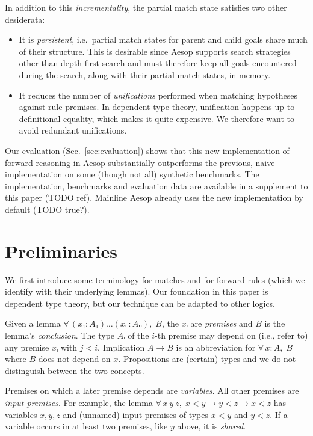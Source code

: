 \documentclass[runningheads]{llncs}
\newcommand{\All}[2]{\ensuremath{\forall\, #1,\; #2}}
\begin{document}
In addition to this \emph{incrementality}, the partial match state satisfies two other desiderata:
\begin{itemize}
  \item It is \emph{persistent}, i.e.\ partial match states for parent and child goals share much of their structure.
        This is desirable since Aesop supports search strategies other than depth-first search and must therefore keep all goals encountered during the search, along with their partial match states, in memory.
  \item It reduces the number of \emph{unifications} performed when matching hypotheses against rule premises.
        In dependent type theory, unification happens up to definitional equality, which makes it quite expensive.
        We therefore want to avoid redundant unifications.
\end{itemize}

Our evaluation (Sec.~\ref{sec:evaluation}) shows that this new implementation of forward reasoning in Aesop substantially outperforms the previous, naive implementation on some (though not all) synthetic benchmarks.
The implementation, benchmarks and evaluation data are available in a supplement to this paper (TODO ref).
Mainline Aesop already uses the new implementation by default (TODO true?).

\section{Preliminaries}

We first introduce some terminology for matches and for forward rules (which we identify with their underlying lemmas).
Our foundation in this paper is dependent type theory, but our technique can be adapted to other logics.

Given a lemma $\All{(x₁ : A₁) \dots (xₙ : Aₙ)}{B}$, the $xᵢ$ are \emph{premises} and $B$ is the lemma's \emph{conclusion}.
The type $Aᵢ$ of the $i$-th premise may depend on (i.e., refer to) any premise $xⱼ$ with $j < i$.
Implication $A → B$ is an abbreviation for $\All{x : A}{B}$ where $B$ does not depend on $x$.
Propositions are (certain) types and we do not distinguish between the two concepts.

Premises on which a later premise depends are \emph{variables}.
All other premises are \emph{input premises}.
For example, the lemma $\All{x~y~z}{x < y → y < z → x < z}$ has variables $x, y, z$ and (unnamed) input premises of types $x < y$ and $y < z$.
If a variable occurs in at least two premises, like $y$ above, it is \emph{shared}.
\end{document}
